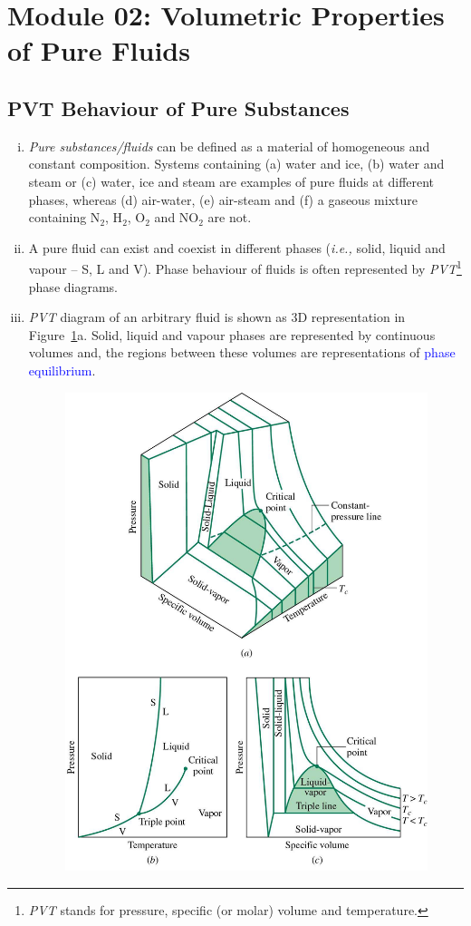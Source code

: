 \documentclass[12pts,a4paper,amsmath,amssymb,floatfix]{article}%
\newcommand{\blue}{\textcolor{blue}}
\newcommand{\ie}{{\it i.e., }}
\begin{document}
\section{Module 02: Volumetric Properties of Pure Fluids}\label{Section:02}


\subsection{PVT Behaviour of Pure Substances}
  
   \begin{enumerate}[i)]
%
       \item {\it Pure substances/fluids} can be defined as a material of homogeneous and constant composition. Systems containing (a) water and ice, (b) water and steam or (c) water, ice and steam are examples of pure fluids at different phases, whereas (d) air-water, (e) air-steam and (f) a gaseous mixture containing N$_{2}$, H$_{2}$, O$_{2}$ and NO$_{2}$ are not. 
%
       \item A pure fluid can exist and coexist in different phases (\ie solid, liquid and vapour -- S, L and V). Phase behaviour of fluids is often represented by {\it PVT}\footnote{{\it PVT} stands for pressure, specific (or molar) volume and temperature.} phase diagrams. 
%
       \item {\it PVT} diagram of an arbitrary fluid is shown as 3D representation in Figure~\ref{Mod02Fig01}a. Solid, liquid and vapour phases are represented by continuous volumes and, the regions between these volumes are representations of \blue{phase equilibrium}.
%
           \begin{figure}[h]
              \begin{center}
                 \includegraphics[width=10.cm,clip]{./../Pics/PVT_Surface.jpg}\label{Mod02Fig01}

\end{center}
\end{figure}
\end{enumerate}
\end{document}
